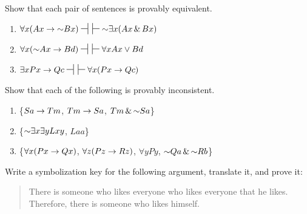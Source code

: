 \problempart
Show that each pair of sentences is provably equivalent.
\begin{enumerate}[label=\arabic*), topsep=0pt, parsep=0pt, itemsep=3pt]
\item $\forall x (Ax\eif \enot Bx) \nsststile{}{} \hspace{.5em} \sststile{}{}\enot\exists x(Ax \eand Bx)$
\item $\forall x (\enot Ax\eif Bd) \nsststile{}{} \hspace{.5em} \sststile{}{} \forall x Ax \eor Bd$
\item $\exists x Px \eif Qc \nsststile{}{} \hspace{.5em} \sststile{}{}\forall x (Px \eif Qc)$
\end{enumerate}



\problempart
Show that each of the following is provably inconsistent.
\begin{enumerate}[label=\arabic*), topsep=0pt, parsep=0pt, itemsep=3pt]
\item \{$Sa\rightarrow Tm$, $Tm \rightarrow Sa$, $Tm \,\&\, \mathord{\sim} Sa$\}
\item \{$\mathord{\sim}\exists x \exists y Lxy$, $Laa$\}
\item \{$\forall x(Px \rightarrow Qx)$, $\forall z(Pz \rightarrow Rz)$, $\forall y Py$, $\mathord{\sim} Qa \,\&\, \mathord{\sim} Rb$\}
\end{enumerate}




\problempart
\label{pr.likes}
Write a symbolization key for the following argument, translate it, and prove it:
\begin{quote}
There is someone who likes everyone who likes everyone that he likes. Therefore, there is someone who likes himself.
\end{quote}





